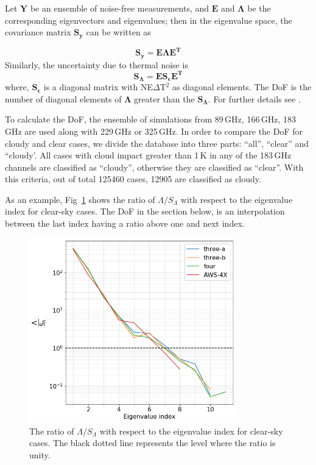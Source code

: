 \documentclass[12pt]{article}
\begin{document}
Let $\mathbf{Y}$ be an ensemble of noise-free measurements, and $\textbf{E}$
and $\mathbf{\Lambda}$ be the corresponding eigenvectors and eigenvalues; then
in the eigenvalue space, the covariance matrix $\mathbf{S_y}$ can be written as

\begin{equation}
\mathbf{S_y = E \Lambda E^T} 
\end{equation}
Similarly, the uncertainty due to thermal noise is
\begin{equation}
\mathbf{S_{\Lambda} = E S_{\epsilon} E^T }
\end{equation}
where, $\mathbf{S_{\epsilon}}$ is a diagonal matrix with NE$\Delta$T$^2$ as
diagonal elements. The DoF is the number of diagonal elements of
$\mathbf{\Lambda}$ greater than the $\mathbf{S_\Lambda}$. For further details
see \citet{eriksson:towar:20}.

To calculate the DoF, the ensemble of simulations from 89\,GHz, 166\,GHz,
183\,GHz are used along with 229\,GHz or 325\,GHz. In order to compare the DoF
for cloudy and clear cases, we divide the database into three parts: ``all'',
``clear'' and ``cloudy'. All cases with cloud impact greater than 1\,K in any
of the 183\,GHz channels are classified as ``cloudy'', otherwise they are
classified as ``clear''. With this criteria, out of total 125460 cases, 12905
are classified as cloudy.

As an example, Fig~\ref{fig:DoF:clear:1200K} shows the ratio of
$\Lambda/S_\Lambda$ with respect to the eigenvalue index for clear-sky cases.
The DoF in the section below, is an interpolation between the last index having a ratio above
one and next index.

\begin{figure}[!tb]
	\centering
	\includegraphics[height=80mm]{DoF.png}
	\caption{ The ratio of $\Lambda/S_\Lambda$ with respect to the eigenvalue
      index for clear-sky cases. The black dotted line represents the level
      where the ratio is unity. }
	\label{fig:DoF:clear:1200K}
\end{figure}
\end{document}
